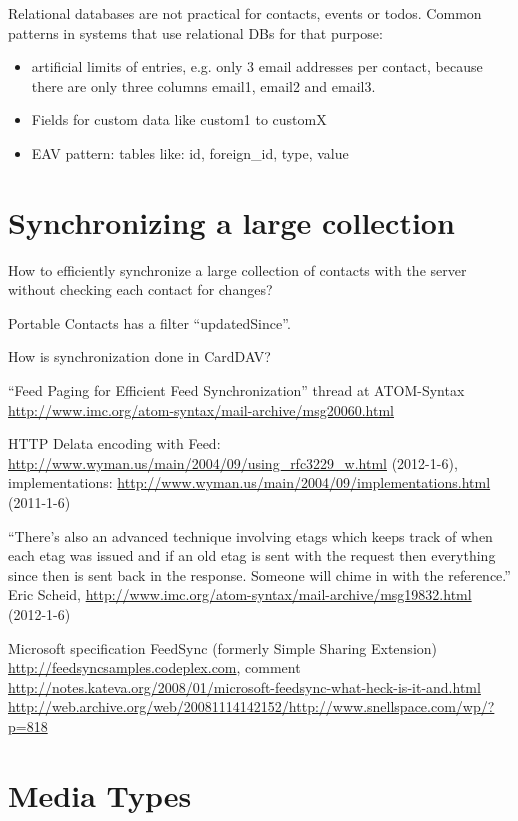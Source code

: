 \documentclass[12pt,a4paper]{scrartcl}		%
\newcommand{\citeurl}[2]{\url{#1} (#2)}
\begin{document}
Relational databases are not practical for contacts, events or todos. Common patterns in systems that use relational DBs for that purpose:
\begin{itemize}
\item artificial limits of entries, e.g. only 3 email addresses per contact, because there are only three columns email1, email2 and email3.
\item Fields for custom data like custom1 to customX
\item EAV pattern: tables like: id, foreign\_id, type, value
\end{itemize}
\section{Synchronizing a large collection}

How to efficiently synchronize a large collection of contacts with the server without checking each contact for changes?

Portable Contacts has a filter ``updatedSince''.

How is synchronization done in CardDAV?

``Feed Paging for Efficient Feed Synchronization'' thread at ATOM-Syntax \url{http://www.imc.org/atom-syntax/mail-archive/msg20060.html}

HTTP Delata encoding with Feed: \citeurl{http://www.wyman.us/main/2004/09/using_rfc3229_w.html}{2012-1-6}, implementations: \citeurl{http://www.wyman.us/main/2004/09/implementations.html}{2011-1-6}

``There's also an advanced technique involving etags which keeps track of when
each etag was issued and if an old etag is sent with the request then
everything since then is sent back in the response. Someone will chime in
with the reference.'' Eric Scheid, \citeurl{http://www.imc.org/atom-syntax/mail-archive/msg19832.html}{2012-1-6}

Microsoft specification FeedSync (formerly Simple Sharing Extension) \url{http://feedsyncsamples.codeplex.com},
 comment \url{http://notes.kateva.org/2008/01/microsoft-feedsync-what-heck-is-it-and.html}
\url{http://web.archive.org/web/20081114142152/http://www.snellspace.com/wp/?p=818}


\section{Media Types}
\end{document}
